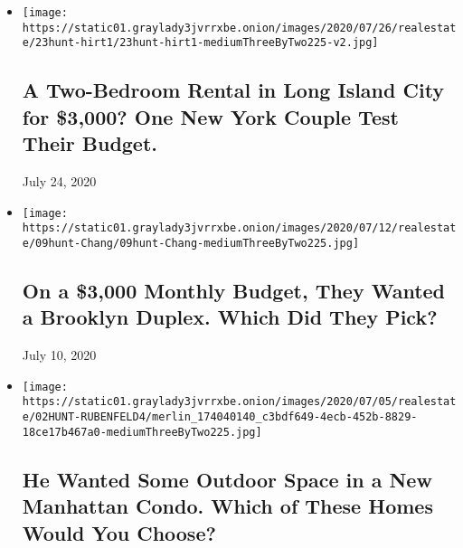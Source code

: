 \begin{itemize}
\item
  \href{https://www.nytimes3xbfgragh.onion/interactive/2020/07/23/realestate/23hunt-hirt.html}{}

  \texttt{[image: https://static01.graylady3jvrrxbe.onion/images/2020/07/26/realestate/23hunt-hirt1/23hunt-hirt1-mediumThreeByTwo225-v2.jpg]}

  \hypertarget{a-two-bedroom-rental-in-long-island-city-for-3000-one-new-york-couple-test-their-budget}{%
  \subsection{A Two-Bedroom Rental in Long Island City for \$3,000? One
  New York Couple Test Their
  Budget.}\label{a-two-bedroom-rental-in-long-island-city-for-3000-one-new-york-couple-test-their-budget}}

  July 24, 2020
\item
  \href{https://www.nytimes3xbfgragh.onion/interactive/2020/07/09/realestate/09hunt-chang.html}{}

  \texttt{[image: https://static01.graylady3jvrrxbe.onion/images/2020/07/12/realestate/09hunt-Chang/09hunt-Chang-mediumThreeByTwo225.jpg]}

  \hypertarget{on-a-3000-monthly-budget-they-wanted-a-brooklyn-duplex-which-did-they-pick}{%
  \subsection{On a \$3,000 Monthly Budget, They Wanted a Brooklyn
  Duplex. Which Did They
  Pick?}\label{on-a-3000-monthly-budget-they-wanted-a-brooklyn-duplex-which-did-they-pick}}

  July 10, 2020
\item
  \href{https://www.nytimes3xbfgragh.onion/interactive/2020/07/02/realestate/02hunt-rubenfeld.html}{}

  \texttt{[image: https://static01.graylady3jvrrxbe.onion/images/2020/07/05/realestate/02HUNT-RUBENFELD4/merlin\_174040140\_c3bdf649-4ecb-452b-8829-18ce17b467a0-mediumThreeByTwo225.jpg]}

  \hypertarget{he-wanted-some-outdoor-space-in-a-new-manhattan-condo-which-of-these-homes-would-you-choose}{%
  \subsection{He Wanted Some Outdoor Space in a New Manhattan Condo.
  Which of These Homes Would You
  Choose?}\label{he-wanted-some-outdoor-space-in-a-new-manhattan-condo-which-of-these-homes-would-you-choose}}


\end{itemize}

